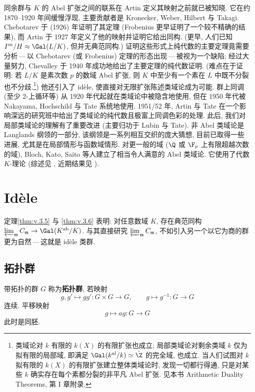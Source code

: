 同余群与 $K$ 的 Abel 扩张之间的联系在 Artin 定义其映射之前就已被知晓. 它在约 1870--1920 年间缓慢浮现, 主要贡献者是 Kronecker, Weber, Hilbert 与 Takagi. Chebotarev 于 (1926) 年证明了其定理 (Frobenius 更早证明了一个较不精确的结果), 而 Artin 于 1927 年定义了他的映射并证明它给出同构. (更早, 人们已知 $I^m/H\approx\Gal(L/K)$, 但并无典范同构.) 证明这些形式上纯代数的主要定理竟需要分析\,---\,以 Chebotarev (或 Frobenius) 定理的形态出现\,---\,被视为一个缺陷; 经过大量努力, Chevalley 于 1940 年成功地给出了主要定理的纯代数证明. (难点在于证明: 若 $L/K$ 是素次数 $p$ 的数域 Abel 扩张, 则 $K$ 中至少有一个素在 $L$ 中既不分裂也不分歧.\footnote{类域论对 $k$ 有限的 $k(X)$ 的有限扩张也成立; 局部类域论对剩余类域 $k$ 仅为拟有限的局部域, 即满足 $\Gal(k^{\mathrm{al}}/k)\simeq\hat{\Z}$ 的完全域, 也成立. 当人们试图对 $k$ 拟有限的 $k(X)$ 的有限扩张建立整体类域论时, 发现一切都行得通, 只是对某些 $k$ 确实存在每个素都分裂的非平凡 Abel 扩张. 见本书 Arithmetic Duality Theorems, 第 I 章附录.}) 他还引入了 idèle, 使直接对无限扩张陈述类域论成为可能. 群上同调 (至少 2-上循环等) 从 1920 年代起就在类域论中被隐含地使用, 但在 1950 年代被 Nakayama, Hochschild 与 Tate 系统地使用. 1951/52 年, Artin 与 Tate 在一个影响深远的研究班中给出了类域论的纯代数且极富上同调色彩的处理. 此后, 我们对局部类域论的理解有了重要改进 (主要归功于 Lubin 与 Tate). 非 Abel 类域论是 Langlands 纲领的一部分, 该纲领是一系列相互交织的庞大猜想, 目前已取得一些进展, 尤其是在局部情形与函数域情形. 对更一般的域 ($\Q$ 或 $\F_p$ 上有限超越次数的域), Bloch, Kato, Saito 等人建立了相当令人满意的 Abel 类域论. 它使用了代数 $K$-理论 (综述见 \cite{Raskind1995}, 近期结果见 \cite{Wiesend2007}).

\section{Idèle}\label{sec:V.4}

定理\ref{thm:v.3.5} 与 \ref{thm:v.3.6} 表明: 对任意数域 $K$, 存在典范同构 $\varprojlim_{\mathfrak{m}}C_{\mathfrak{m}}\to\Gal(K^{\mathrm{ab}}/K)$. 与其直接研究 $\varprojlim_{\mathfrak{m}}C_{\mathfrak{m}}$, 不如引入另一个以它为商的群更为自然\,---\,这就是 idèle 类群.

\label{pg:orig169}%
\subsection*{拓扑群}

带拓扑的群 $G$ 称为\textbf{拓扑群}, 若映射
\[
g,g'\mapsto gg'\colon G\times G\to G,\qquad g\mapsto g^{-1}\colon G\to G
\]
连续. 平移映射
\[
g\mapsto ag\colon G\to G
\]
此时是同胚.

